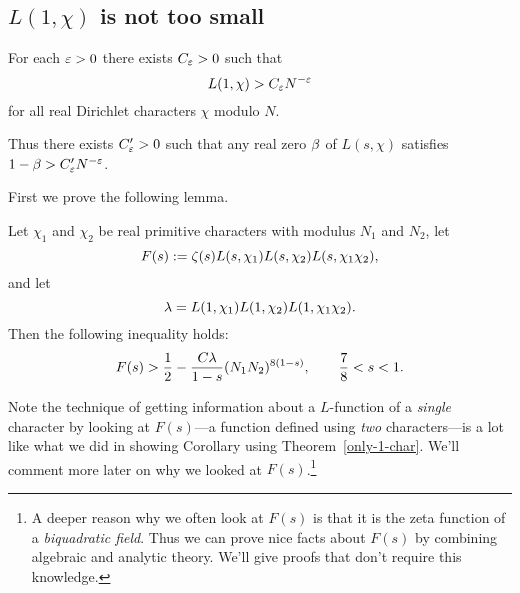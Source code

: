\subsection{$L(1,\chi)$ is not too small}
\begin{thm}
For each $\varepsilon>0$ there exists $C_{\varepsilon}>0$ such that 
\[
L(1,\chi)>C_{\varepsilon} N^{-\varepsilon}
\]
for all real Dirichlet characters $\chi$ modulo $N$.

Thus there exists $C_{\varepsilon}'>0$ such that any real zero $\beta$ of $L(s,\chi)$ satisfies $1-\beta>C'_{\varepsilon}N^{-\varepsilon}$.
\end{thm}
First we prove the following lemma.
\begin{lem}
Let $\chi_1$ and $\chi_2$ be real primitive characters with modulus $N_1$ and $N_2$, let
\[
F(s):=\zeta(s)L(s,\chi_1)L(s,\chi_2)L(s,\chi_1\chi_2),
\]
and let
\[
\lambda=L(1,\chi_1)L(1,\chi_2)L(1,\chi_1\chi_2).
\]
Then the following inequality holds:
\[
F(s)> \frac{1}{2}-\frac{C\lambda}{1-s}(N_1N_2)^{8(1-s)},\qquad \frac{7}{8}<s<1.
\]
\end{lem}
Note the technique of getting information about a $L$-function of a \emph{single} character by looking at $F(s)$---a function defined using \emph{two} characters---is a lot like what we did in showing Corollary  using Theorem~\ref{only-1-char}. We'll comment more later on why we looked at $F(s)$.\footnote{A deeper reason why we often look at $F(s)$ is that it is the zeta function of a \emph{biquadratic field}. Thus we can prove nice facts about $F(s)$ by combining algebraic and analytic theory. We'll give proofs that don't require this knowledge.}
